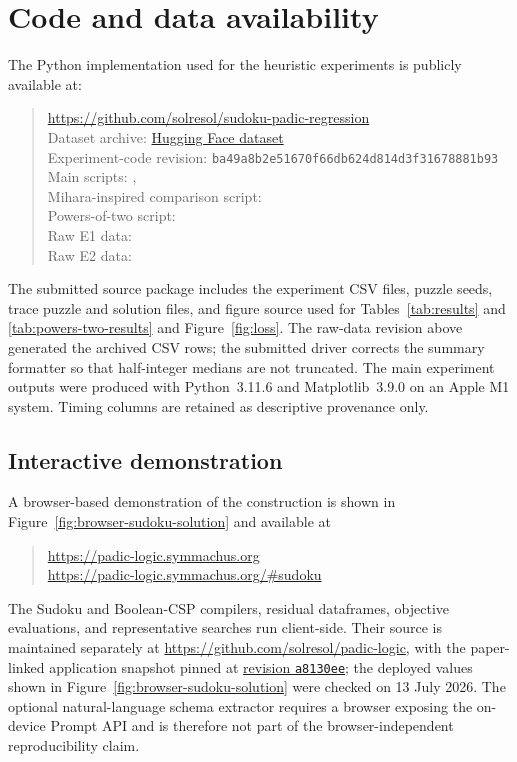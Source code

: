 \documentclass[11pt]{article}
\begin{document}
\section*{Code and data availability}
The Python implementation used for the heuristic experiments is publicly available at:
\begin{quote}\footnotesize
\url{https://github.com/solresol/sudoku-padic-regression}\\
Dataset archive: \href{https://huggingface.co/datasets/gregb/sudoku-padic-regression-experiments}{Hugging Face dataset}\\
Experiment-code revision: \texttt{ba49a8b2e51670f66db624d814d3f31678881b93}\\
Main scripts: , \\
Mihara-inspired comparison script: \\
Powers-of-two script: \\
Raw E1 data: \\
Raw E2 data: 
\end{quote}
The submitted source package includes the experiment CSV files, puzzle seeds, trace puzzle and solution files, and figure source used for Tables~\ref{tab:results} and \ref{tab:powers-two-results} and Figure~\ref{fig:loss}. The raw-data revision above generated the archived CSV rows; the submitted driver corrects the summary formatter so that half-integer medians are not truncated. The main experiment outputs were produced with Python~3.11.6 and Matplotlib~3.9.0 on an Apple M1 system. Timing columns are retained as descriptive provenance only.

\subsection*{Interactive demonstration}
A browser-based demonstration of the construction is shown in Figure~\ref{fig:browser-sudoku-solution} and available at
\begin{quote}\small
\url{https://padic-logic.symmachus.org}\\
\url{https://padic-logic.symmachus.org/\#sudoku}
\end{quote}
The Sudoku and Boolean-CSP compilers, residual dataframes, objective evaluations, and representative searches run client-side. Their source is maintained separately at \url{https://github.com/solresol/padic-logic}, with the paper-linked application snapshot pinned at \href{https://github.com/solresol/padic-logic/commit/a8130ee7784035d17fc2aea3af56eda27bf478e1}{revision \texttt{a8130ee}}; the deployed values shown in Figure~\ref{fig:browser-sudoku-solution} were checked on 13 July 2026. The optional natural-language schema extractor requires a browser exposing the on-device Prompt API and is therefore not part of the browser-independent reproducibility claim.
\end{document}
